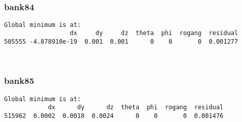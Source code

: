 \documentclass[11pt]{article}
\begin{document}
    \begin{center}
    \end{center}
    { \hspace*{\fill} \\}
    
    \hypertarget{bank84}{%
\subsubsection{bank84}\label{bank84}}

    \begin{Verbatim}[commandchars=\\\{\}]
Global minimum is at:
                  dx     dy     dz  theta  phi  rogang  residual
505555 -4.878910e-19  0.001  0.001      0    0       0  0.001277
    \end{Verbatim}

    \begin{center}
    \end{center}
    { \hspace*{\fill} \\}
    
    \hypertarget{bank85}{%
\subsubsection{bank85}\label{bank85}}

    \begin{Verbatim}[commandchars=\\\{\}]
Global minimum is at:
            dx      dy      dz  theta  phi  rogang  residual
515962  0.0002  0.0018  0.0024      0    0       0  0.001476
    \end{Verbatim}

    \begin{center}
    \end{center}
    { \hspace*{\fill} \\}
    

    
    
    
\end{document}
